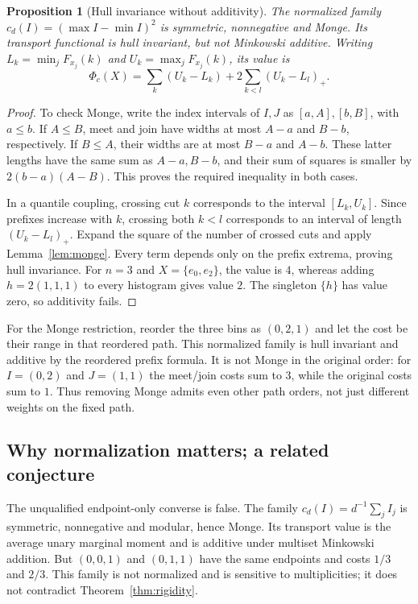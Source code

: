 \documentclass[11pt]{article}
\newtheorem{proposition}[theorem]{Proposition}
\theoremstyle{definition}\newtheorem{definition}[theorem]{Definition}
\newcommand{\1}{\mathbf 1}
\begin{document}
\begin{proposition}[Hull invariance without additivity]\label{prop:squared}
The normalized family $c_d(I)=(\max I-\min I)^2$ is symmetric, nonnegative and
Monge. Its transport functional is hull invariant, but not Minkowski additive.
Writing $L_k=\min_j F_{x_j}(k)$ and $U_k=\max_j F_{x_j}(k)$, its value is
\[
 \Phi_c(X)=\sum_k(U_k-L_k)+2\sum_{k<l}(U_k-L_l)_+.
\]
\end{proposition}
\begin{proof}
To check Monge, write the index intervals of $I,J$ as $[a,A],[b,B]$, with
$a\le b$. If $A\le B$, meet and join have widths at most $A-a$ and $B-b$,
respectively. If $B\le A$, their widths are at most $B-a$ and $A-b$.
These latter lengths have the same sum as $A-a,B-b$, and their sum of squares
is smaller by $2(b-a)(A-B)$. This proves the required inequality in both cases.

In a quantile coupling, crossing cut $k$ corresponds to the interval
$[L_k,U_k]$. Since prefixes increase with $k$, crossing both $k<l$ corresponds
to an interval of length $(U_k-L_l)_+$. Expand the square of the number of
crossed cuts and apply Lemma~\ref{lem:monge}. Every term depends only on the
prefix extrema, proving hull invariance. For $n=3$ and $X=\{e_0,e_2\}$, the
value is $4$, whereas adding $h=2(1,1,1)$ to every histogram gives value $2$.
The singleton $\{h\}$ has value zero, so additivity fails.
\end{proof}

For the Monge restriction, reorder the three bins as $(0,2,1)$ and let the
cost be their range in that reordered path. This normalized family is hull
invariant and additive by the reordered prefix formula. It is not Monge in
the original order: for $I=(0,2)$ and $J=(1,1)$ the meet/join costs sum to
$3$, while the original costs sum to $1$. Thus removing Monge admits even
other path orders, not just different weights on the fixed path.

\subsection{Why normalization matters; a related conjecture}
The unqualified endpoint-only converse is false. The family
$c_d(I)=d^{-1}\sum_j I_j$ is symmetric, nonnegative and modular, hence Monge.
Its transport value is the average unary marginal moment and is additive under
multiset Minkowski addition. But $(0,0,1)$ and $(0,1,1)$ have the same endpoints
and costs $1/3$ and $2/3$. This family is not normalized and is sensitive to
multiplicities; it does not contradict Theorem~\ref{thm:rigidity}.
\end{document}
